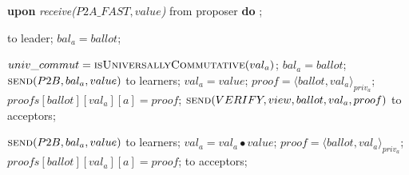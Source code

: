 \begin{algorithm}
\begin{algorithmic}[1]
		\State		
		\State \textbf{upon} \textit{receive($P2A\_FAST, value$)} from proposer \textbf{do}
		\State \hspace{\algorithmicindent} ;
		
		\State
		\State {} to leader;
		\State $bal_a = ballot$;	
		\EndIf
		\EndFunction
		
		\State
		\State $univ\_commut = \Call{isUniversallyCommutative}{val_a}$;
		\State $bal_a = ballot$;
		\State $\Call{send}{P2B,bal_a, value}$ to learners;
		\Else 
		\State $val_a = value$;
		\State $proof = \langle ballot, val_a \rangle_{priv_a}$;
		\State $proofs[ballot][val_a][a] = proof$;
		\State $\Call{send}{VERIFY, view, ballot, val_a, proof}$ to acceptors;
		\EndIf
		\EndIf
		\EndFunction
		
		\State
		\State $\Call{send}{P2B,bal_a, value}$ to learners;
		\Else
		\State $val_a = val_a \bullet value$;
		\State $proof = \langle ballot, val_a \rangle_{priv_a}$;
		\State $proofs[ballot][val_a][a] = proof$;
		\State {} to acceptors;
		\EndIf
		\EndIf
		\EndFunction
	\end{algorithmic}
\end{algorithm}

